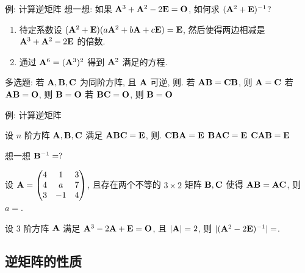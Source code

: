 \begin{frame}{例: 计算逆矩阵}
	\onslide<+->
	想一想: 如果 ${\mathbf{A}}^3+{\mathbf{A}}^2-2{\mathbf{E}}={\mathbf{O}}$, 如何求 $({\mathbf{A}}^2+{\mathbf{E}})^{-1}$?
	\onslide<+->
	\begin{enumerate}
		\item 待定系数设 $({\mathbf{A}}^2+{\mathbf{E}})(a{\mathbf{A}}^2+b{\mathbf{A}}+c{\mathbf{E}})={\mathbf{E}}$, 然后使得两边相减是 ${\mathbf{A}}^3+{\mathbf{A}}^2-2{\mathbf{E}}$ 的倍数.
		\item 通过 ${\mathbf{A}}^6=({\mathbf{A}}^3)^2$ 得到 ${\mathbf{A}}^2$ 满足的方程.
	\end{enumerate}
	\onslide<+->
	\begin{example}
		多选题: 若 ${\mathbf{A}},{\mathbf{B}},{\mathbf{C}}$ 为同阶方阵, 且 ${\mathbf{A}}$ 可逆, 则.
		{若 ${\mathbf{A}}{\mathbf{B}}={\mathbf{C}}{\mathbf{B}}$, 则 ${\mathbf{A}}={\mathbf{C}}$}%
		{若 ${\mathbf{A}}{\mathbf{B}}={\mathbf{O}}$, 则 ${\mathbf{B}}={\mathbf{O}}$}%
		{若 ${\mathbf{B}}{\mathbf{C}}={\mathbf{O}}$, 则 ${\mathbf{B}}={\mathbf{O}}$}
	\end{example}
\end{frame}


\begin{frame}{例: 计算逆矩阵}
	\onslide<+->
	\begin{example}
		设 $n$ 阶方阵 ${\mathbf{A}},{\mathbf{B}},{\mathbf{C}}$ 满足 ${\mathbf{A}}{\mathbf{B}}{\mathbf{C}}={\mathbf{E}}$, 则\fillbrace{\visible<+->{\alert{D}}}.
		\xx{$\bfA\bfC\bfB=\bfE$}%
		{${\mathbf{C}}{\mathbf{B}}{\mathbf{A}}={\mathbf{E}}$}%
		{${\mathbf{B}}{\mathbf{A}}{\mathbf{C}}={\mathbf{E}}$}%
		{${\mathbf{C}}{\mathbf{A}}{\mathbf{B}}={\mathbf{E}}$}
	\end{example}
	\onslide<+->
	想一想 ${\mathbf{B}}^{-1}=?$
	\onslide<+->
	\begin{exercise}
		设 ${\mathbf{A}}=\begin{pmatrix}
			4&1&3\\4&a&7\\3&-1&4
		\end{pmatrix}$, 且存在两个不等的 $3\times2$ 矩阵 ${\mathbf{B}},{\mathbf{C}}$ 使得 ${\mathbf{A}}{\mathbf{B}}={\mathbf{A}}{\mathbf{C}}$, 则 $a=$\fillblank{\visible<+->{$-3$}}.
	\end{exercise}
	\onslide<+->
	\begin{exercise}
		设 $3$ 阶方阵 ${\mathbf{A}}$ 满足 ${\mathbf{A}}^3-2{\mathbf{A}}+{\mathbf{E}}={\mathbf{O}}$, 且 $|{\mathbf{A}}|=2$, 则 $|({\mathbf{A}}^2-2{\mathbf{E}})^{-1}|=$\fillblank{\visible<+->{$-2$}}.
	\end{exercise}
\end{frame}


\subsection{逆矩阵的性质}


